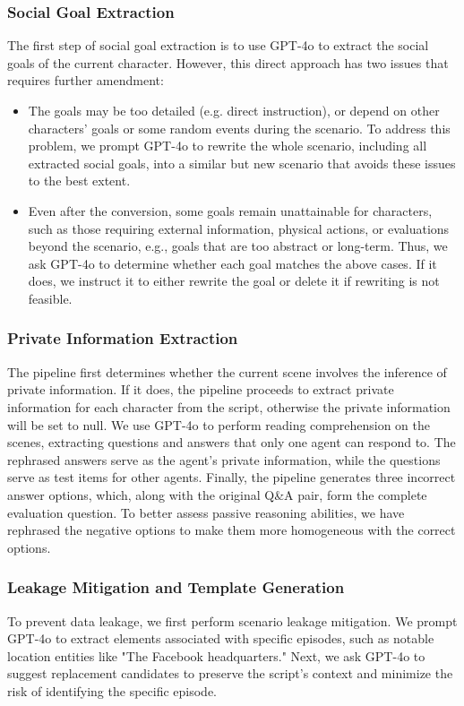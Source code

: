 
\subsubsection{Social Goal Extraction}

The first step of social goal extraction is to use GPT-4o to extract the social goals of the current character.
However, this direct approach has two issues that requires further amendment:

\begin{itemize}
    \item The goals may be too detailed (e.g. direct instruction), or depend on other characters' goals or some random events during the scenario.
    To address this problem, we prompt GPT-4o to rewrite the whole scenario, including all extracted social goals, into a similar but new scenario that avoids these issues to the best extent.
    \item Even after the conversion, some goals remain unattainable for characters, such as those requiring external information, physical actions, or evaluations beyond the scenario, e.g., goals that are too abstract or long-term.
    Thus, we ask GPT-4o to determine whether each goal matches the above cases. If it does, we instruct it to either rewrite the goal or delete it if rewriting is not feasible.
\end{itemize}

\subsubsection{Private Information Extraction}

The pipeline first determines whether the current scene involves the inference of private information. If it does, the pipeline proceeds to extract private information for each character from the script, otherwise the private information will be set to null.
We use GPT-4o to perform reading comprehension on the scenes, extracting questions and answers that only one agent can respond to. The rephrased answers serve as the agent's private information, while the questions serve as test items for other agents.
Finally, the pipeline generates three incorrect answer options, which, along with the original Q\&A pair, form the complete evaluation question.
To better assess passive reasoning abilities, we have rephrased the negative options to make them more homogeneous with the correct options.

\subsubsection{Leakage Mitigation and Template Generation}

To prevent data leakage, we first perform scenario leakage mitigation. 
We prompt GPT-4o to extract elements associated with specific episodes, such as notable location entities like "The Facebook headquarters."
Next, we ask GPT-4o to suggest replacement candidates to preserve the script's context and minimize the risk of identifying the specific episode.